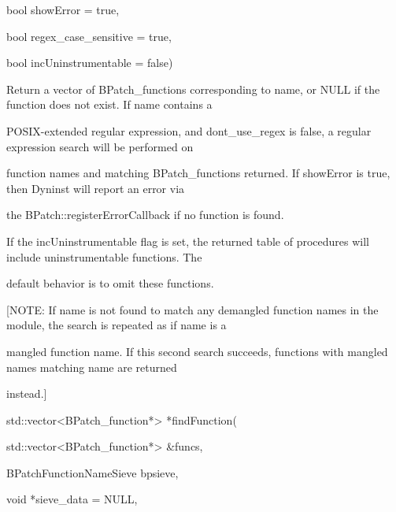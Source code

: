{{{bool showError = true,}



{

bool regex_case_sensitive = true,}



{

bool incUninstrumentable = false)}



{

Return a vector of BPatch_functions corresponding to name, or NULL if the function does not exist. If name contains a

POSIX-extended regular expression, and dont_use_regex is false, a regular expression search will be performed on

function names and matching BPatch_functions returned. If showError is true, then Dyninst will report an error via

the BPatch::registerErrorCallback if no function is found.}



{

If the incUninstrumentable flag is set, the returned table of procedures will include uninstrumentable functions. The

default behavior is to omit these functions.}



{

[NOTE: If name is not found to match any demangled function names in the module, the search is repeated as if name is a

mangled function name. If this second search succeeds, functions with mangled names matching name are returned

instead.]}





\bigskip



{

std::vector<BPatch_function*> *findFunction(}



{

std::vector<BPatch_function*> &funcs,}



{

BPatchFunctionNameSieve bpsieve,}



{

void *sieve_data = NULL,}



}}
